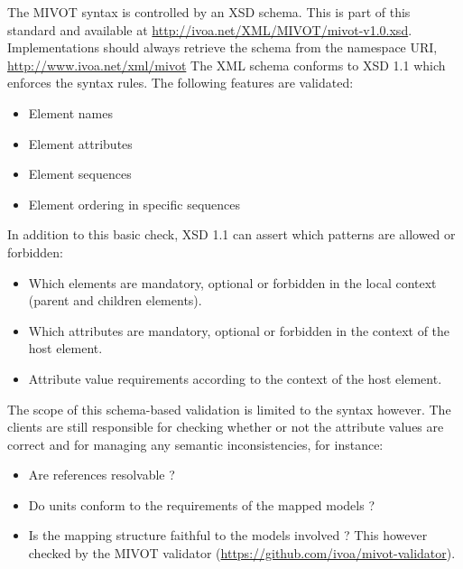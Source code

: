 The MIVOT syntax is controlled by an XSD schema.
This is part of this standard and available at \url{http://ivoa.net/XML/MIVOT/mivot-v1.0.xsd}.
Implementations should always retrieve the schema from the namespace URI, \url{http://www.ivoa.net/xml/mivot}
The XML schema conforms to XSD 1.1 \citep{std:xsd1.1} which enforces the syntax rules. 
The following features are validated:

\begin{itemize} 
  \item Element names 
  \item Element attributes
  \item Element sequences 
  \item Element ordering in specific sequences
\end{itemize}

In addition to this basic check, XSD 1.1 can assert which patterns are allowed or forbidden:

\begin{itemize} 
  \item Which elements are mandatory, optional  or forbidden in the local context (parent and children elements).
  \item Which attributes are mandatory, optional  or forbidden in the context of the host element.
  \item Attribute value requirements according to the context of the host element.

\end{itemize}
 
The scope of this schema-based validation is limited to the syntax however. 
The clients are still responsible for checking whether or not the attribute values are correct and for managing any semantic inconsistencies, for instance:

\begin{itemize} 
  \item Are references resolvable ? 
  \item Do units conform to the requirements of the mapped models ?
  \item Is the mapping structure faithful to the models involved ?
        This however checked by the MIVOT validator (\url{https://github.com/ivoa/mivot-validator}).
\end{itemize}


